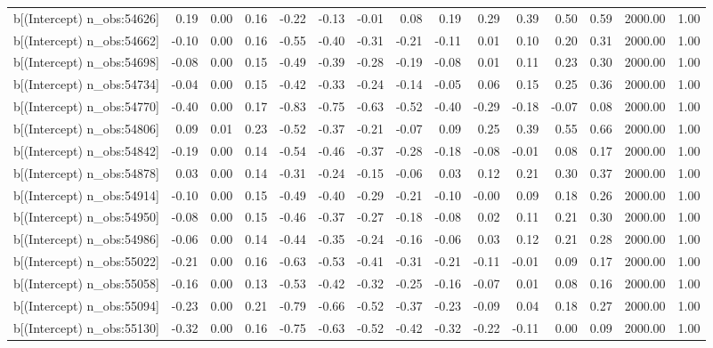 \begin{table}[ht]
\begin{tabular}{rrrrrrrrrrrrrrr}
  b[(Intercept) n\_obs:54626] & 0.19 & 0.00 & 0.16 & -0.22 & -0.13 & -0.01 & 0.08 & 0.19 & 0.29 & 0.39 & 0.50 & 0.59 & 2000.00 & 1.00 \\ 
  b[(Intercept) n\_obs:54662] & -0.10 & 0.00 & 0.16 & -0.55 & -0.40 & -0.31 & -0.21 & -0.11 & 0.01 & 0.10 & 0.20 & 0.31 & 2000.00 & 1.00 \\ 
  b[(Intercept) n\_obs:54698] & -0.08 & 0.00 & 0.15 & -0.49 & -0.39 & -0.28 & -0.19 & -0.08 & 0.01 & 0.11 & 0.23 & 0.30 & 2000.00 & 1.00 \\ 
  b[(Intercept) n\_obs:54734] & -0.04 & 0.00 & 0.15 & -0.42 & -0.33 & -0.24 & -0.14 & -0.05 & 0.06 & 0.15 & 0.25 & 0.36 & 2000.00 & 1.00 \\ 
  b[(Intercept) n\_obs:54770] & -0.40 & 0.00 & 0.17 & -0.83 & -0.75 & -0.63 & -0.52 & -0.40 & -0.29 & -0.18 & -0.07 & 0.08 & 2000.00 & 1.00 \\ 
  b[(Intercept) n\_obs:54806] & 0.09 & 0.01 & 0.23 & -0.52 & -0.37 & -0.21 & -0.07 & 0.09 & 0.25 & 0.39 & 0.55 & 0.66 & 2000.00 & 1.00 \\ 
  b[(Intercept) n\_obs:54842] & -0.19 & 0.00 & 0.14 & -0.54 & -0.46 & -0.37 & -0.28 & -0.18 & -0.08 & -0.01 & 0.08 & 0.17 & 2000.00 & 1.00 \\ 
  b[(Intercept) n\_obs:54878] & 0.03 & 0.00 & 0.14 & -0.31 & -0.24 & -0.15 & -0.06 & 0.03 & 0.12 & 0.21 & 0.30 & 0.37 & 2000.00 & 1.00 \\ 
  b[(Intercept) n\_obs:54914] & -0.10 & 0.00 & 0.15 & -0.49 & -0.40 & -0.29 & -0.21 & -0.10 & -0.00 & 0.09 & 0.18 & 0.26 & 2000.00 & 1.00 \\ 
  b[(Intercept) n\_obs:54950] & -0.08 & 0.00 & 0.15 & -0.46 & -0.37 & -0.27 & -0.18 & -0.08 & 0.02 & 0.11 & 0.21 & 0.30 & 2000.00 & 1.00 \\ 
  b[(Intercept) n\_obs:54986] & -0.06 & 0.00 & 0.14 & -0.44 & -0.35 & -0.24 & -0.16 & -0.06 & 0.03 & 0.12 & 0.21 & 0.28 & 2000.00 & 1.00 \\ 
  b[(Intercept) n\_obs:55022] & -0.21 & 0.00 & 0.16 & -0.63 & -0.53 & -0.41 & -0.31 & -0.21 & -0.11 & -0.01 & 0.09 & 0.17 & 2000.00 & 1.00 \\ 
  b[(Intercept) n\_obs:55058] & -0.16 & 0.00 & 0.13 & -0.53 & -0.42 & -0.32 & -0.25 & -0.16 & -0.07 & 0.01 & 0.08 & 0.16 & 2000.00 & 1.00 \\ 
  b[(Intercept) n\_obs:55094] & -0.23 & 0.00 & 0.21 & -0.79 & -0.66 & -0.52 & -0.37 & -0.23 & -0.09 & 0.04 & 0.18 & 0.27 & 2000.00 & 1.00 \\ 
  b[(Intercept) n\_obs:55130] & -0.32 & 0.00 & 0.16 & -0.75 & -0.63 & -0.52 & -0.42 & -0.32 & -0.22 & -0.11 & 0.00 & 0.09 & 2000.00 & 1.00 \\ 

\end{tabular}
\end{table}
